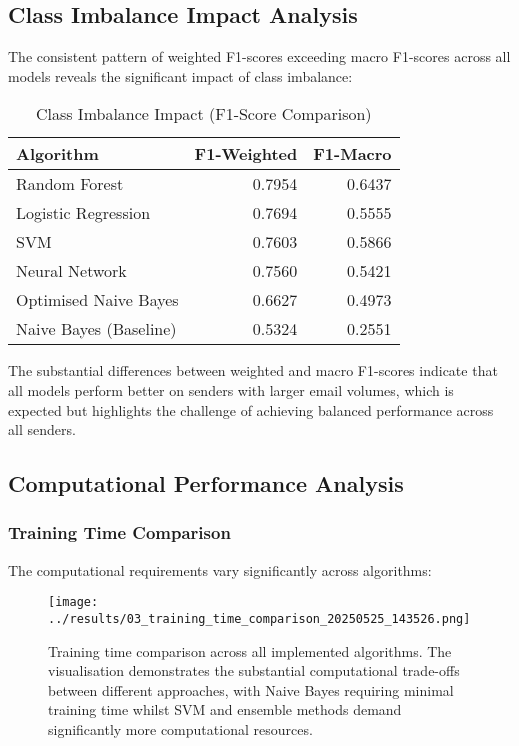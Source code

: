 \documentclass[11pt,a4paper]{article}
\begin{document}
\subsection{Class Imbalance Impact Analysis}

The consistent pattern of weighted F1-scores exceeding macro F1-scores across all models reveals the significant impact of class imbalance:

\begin{table}[H]
    \centering
    \caption{Class Imbalance Impact (F1-Score Comparison)}
    \begin{tabular}{@{}lrr@{}}
        \toprule
        \textbf{Algorithm} & \textbf{F1-Weighted} & \textbf{F1-Macro} \\
        \midrule
        Random Forest & 0.7954 & 0.6437 \\
        Logistic Regression & 0.7694 & 0.5555 \\
        SVM & 0.7603 & 0.5866 \\
        Neural Network & 0.7560 & 0.5421 \\
        Optimised Naive Bayes & 0.6627 & 0.4973 \\
        Naive Bayes (Baseline) & 0.5324 & 0.2551 \\
        \bottomrule
    \end{tabular}
\end{table}

The substantial differences between weighted and macro F1-scores indicate that all models perform better on senders with larger email volumes, which is expected but highlights the challenge of achieving balanced performance across all senders.

\subsection{Computational Performance Analysis}

\subsubsection{Training Time Comparison}

The computational requirements vary significantly across algorithms:

\begin{figure}[H]
    \centering
    \texttt{[image: ../results/03\_training\_time\_comparison\_20250525\_143526.png]}
    \caption{Training time comparison across all implemented algorithms. The visualisation demonstrates the substantial computational trade-offs between different approaches, with Naive Bayes requiring minimal training time whilst SVM and ensemble methods demand significantly more computational resources.}
    \label{fig:training_time}
\end{figure}
\end{document}
